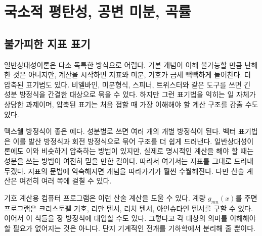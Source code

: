 \chapter{국소적 평탄성, 공변 미분, 곡률}


\section{불가피한 지표 표기}

일반상대성이론은 다소 독특한 방식으로 어렵다. 기본 개념이 이해 불가능할 만큼 난해한 것은 아니지만, 계산을 시작하면 지표와 미분, 기호가 금세 빽빽하게 들어찬다. 더 압축된 표기법도 있다. 비엘바인, 미분형식, 스피너, 트위스터와 같은 도구를 쓰면 긴 성분 방정식을 간결한 대상으로 묶을 수 있다. 하지만 그런 표기법을 익히는 일 자체가 상당한 과제이며, 압축된 표기는 처음 접할 때 가장 이해해야 할 계산 구조를 감출 수도 있다.

맥스웰 방정식이 좋은 예다. 성분별로 쓰면 여러 개의 개별 방정식이 된다. 벡터 표기법은 이를 발산 방정식과 회전 방정식으로 묶어 구조를 더 쉽게 드러낸다. 일반상대성이론에도 이와 비슷하게 압축하는 방법이 있지만, 실제로 명시적인 계산을 해야 할 때는 성분을 쓰는 방법이 여전히 믿을 만한 길이다. 따라서 여기서는 지표를 그대로 드러내 두겠다. 지표의 문법에 익숙해지면 개념을 따라가기가 훨씬 수월해진다. 다만 산술 계산은 여전히 여러 쪽에 걸칠 수 있다.

기호 계산용 컴퓨터 프로그램은 이런 산술 계산을 도울 수 있다. 계량 \(g_{mn}(x)\)를 주면 프로그램은 크리스토펠 기호, 리만 텐서, 리치 텐서, 아인슈타인 텐서를 구할 수 있다. 이어서 이 식들을 장 방정식에 대입할 수도 있다. 그렇다고 각 대상의 의미를 이해해야 할 필요가 없어지는 것은 아니다. 단지 기계적인 전개를 기하학에서 분리해 줄 뿐이다.

\begin{classroomqa}
\end{classroomqa}

